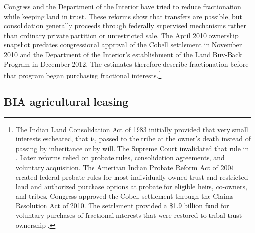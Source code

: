 \documentclass[12pt]{article}
\begin{document}
Congress and the Department of the Interior have tried to reduce fractionation while keeping land in trust. These reforms show that transfers are possible, but consolidation generally proceeds through federally supervised mechanisms rather than ordinary private partition or unrestricted sale. The April 2010 ownership snapshot predates congressional approval of the Cobell settlement in November 2010 and the Department of the Interior's establishment of the Land Buy-Back Program in December 2012. The estimates therefore describe fractionation before that program began purchasing fractional interests.\footnote{The Indian Land Consolidation Act of 1983 initially provided that very small interests escheated, that is, passed to the tribe at the owner's death instead of passing by inheritance or by will. The Supreme Court invalidated that rule in \citet{HodelIrving1987}. Later reforms relied on probate rules, consolidation agreements, and voluntary acquisition. The American Indian Probate Reform Act of 2004 created federal probate rules for most individually owned trust and restricted land and authorized purchase options at probate for eligible heirs, co-owners, and tribes. Congress approved the Cobell settlement through the Claims Resolution Act of 2010. The settlement provided a \$1.9 billion fund for voluntary purchases of fractional interests that were restored to tribal trust ownership \citep{AIPRA2004,ClaimsResolutionAct2010,DOILandBuyBackProgram2023}.}

\subsection{BIA agricultural leasing} \label{Leasing}
\end{document}
